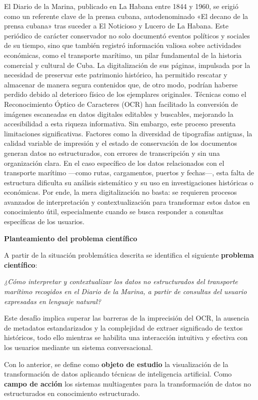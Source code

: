 El Diario de la Marina, publicado en La Habana entre 1844 y 1960, se erigió como un referente clave de la prensa cubana, autodenominado «El decano de la prensa cubana» tras suceder a El Noticioso y Lucero de La Habana. Este periódico de carácter conservador no solo documentó eventos políticos y sociales de su tiempo, sino que también registró información valiosa sobre actividades económicas, como el transporte marítimo, un pilar fundamental de la historia comercial y cultural de Cuba. La digitalización de sus páginas, impulsada por la necesidad de preservar este patrimonio histórico, ha permitido rescatar y almacenar de manera segura contenidos que, de otro modo, podrían haberse perdido debido al deterioro físico de los ejemplares originales. Técnicas como el Reconocimiento Óptico de Caracteres (OCR) han facilitado la conversión de imágenes escaneadas en datos digitales editables y buscables, mejorando la accesibilidad a esta riqueza informativa. Sin embargo, este proceso presenta limitaciones significativas. Factores como la diversidad de tipografías antiguas, la calidad variable de impresión y el estado de conservación de los documentos generan datos no estructurados, con errores de transcripción y sin una organización clara. En el caso específico de los datos relacionados con el transporte marítimo —como rutas, cargamentos, puertos y fechas—, esta falta de estructura dificulta su análisis sistemático y su uso en investigaciones históricas o económicas. Por ende, la mera digitalización no basta: se requieren procesos avanzados de interpretación y contextualización para transformar estos datos en conocimiento útil, especialmente cuando se busca responder a consultas específicas de los usuarios.

\textbf{Planteamiento del problema científico}

A partir de la situación problemática descrita se identifica el siguiente \textbf{problema científico}:

\textit{¿Cómo interpretar y contextualizar los datos no estructurados del transporte marítimo recogidos en el Diario de la Marina, a partir de consultas del usuario expresadas en lenguaje natural?}

Este desafío implica superar las barreras de la imprecisión del OCR, la ausencia de metadatos estandarizados y la complejidad de extraer significado de textos históricos, todo ello mientras se habilita una interacción intuitiva y efectiva con los usuarios mediante un sistema conversacional.

Con lo anterior, se define como \textbf{objeto de estudio} la visualización de la transformación de datos aplicando técnicas de inteligencia artificial. Como \textbf{campo de acción} los sistemas multiagentes para la transformación de datos no estructurados en conocimiento estructurado.

